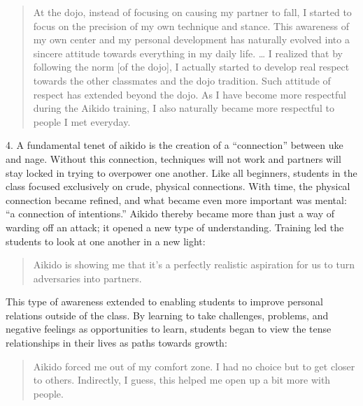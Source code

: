 \begin{quote}
At the dojo, instead of focusing on causing my partner to fall, I started to focus on the precision of my own technique and stance. This awareness of my own center and my personal development has naturally evolved into a sincere attitude towards everything in my daily life. \ldots{} I realized that by following the norm [of the dojo], I actually started to develop real respect towards the other classmates and the dojo tradition. Such attitude of respect has extended beyond the dojo. As I have become more respectful during the Aikido training, I also naturally became more respectful to people I met everyday.
\end{quote}

4. A fundamental tenet of aikido is the creation of a ``connection'' between uke and nage. Without this connection, techniques will not work and partners will stay locked in trying to overpower one another. Like all beginners, students in the class focused exclusively on crude, physical connections. With time, the physical connection became refined, and what became even more important was mental: ``a connection of intentions.'' Aikido thereby became more than just a way of warding off an attack; it opened a new type of understanding. Training led the students to look at one another in a new light:

\begin{quote}
Aikido is showing me that it's a perfectly realistic aspiration for us to turn adversaries into partners.
\end{quote}

This type of awareness extended to enabling students to improve personal relations outside of the class. By learning to take challenges, problems, and negative feelings as opportunities to learn, students began to view the tense relationships in their lives as paths towards growth:

\begin{quote}
Aikido forced me out of my comfort zone. I had no choice but to get closer to others. Indirectly, I guess, this helped me open up a bit more with people. 
\end{quote}